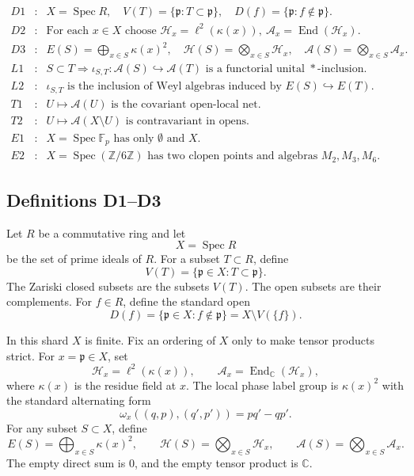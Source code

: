 \[
\begin{array}{rcl}
D1&:&X=\operatorname{Spec}R,\quad
      V(T)=\{\mathfrak p:T\subset\mathfrak p\},\quad
      D(f)=\{\mathfrak p:f\notin\mathfrak p\}.\\
D2&:&\text{For each }x\in X\text{ choose }
      \mathcal H_x=\ell^2(\kappa(x)),\
      \mathcal A_x=\operatorname{End}(\mathcal H_x).\\
D3&:&E(S)=\bigoplus_{x\in S}\kappa(x)^2,\quad
      \mathcal H(S)=\bigotimes_{x\in S}\mathcal H_x,\quad
      \mathcal A(S)=\bigotimes_{x\in S}\mathcal A_x.\\
L1&:&S\subset T\Rightarrow
      \iota_{S,T}:\mathcal A(S)\hookrightarrow\mathcal A(T)
      \text{ is a functorial unital }*\text{-inclusion}.\\
L2&:&\iota_{S,T}\text{ is the inclusion of Weyl algebras induced by }
      E(S)\hookrightarrow E(T).\\
T1&:&U\mapsto\mathcal A(U)\text{ is the covariant open-local net.}\\
T2&:&U\mapsto\mathcal A(X\setminus U)\text{ is contravariant in opens.}\\
E1&:&X=\operatorname{Spec}\mathbb F_p
      \text{ has only }\emptyset\text{ and }X.\\
E2&:&X=\operatorname{Spec}(\mathbb Z/6\mathbb Z)
      \text{ has two clopen points and algebras }M_2,M_3,M_6.
\end{array}
\]

\subsection{Definitions D1--D3}

Let \(R\) be a commutative ring and let
\[
  X=\operatorname{Spec}R
\]
be the set of prime ideals of \(R\).  For a subset \(T\subset R\), define
\[
  V(T)=\{\mathfrak p\in X:T\subset\mathfrak p\}.
\]
The Zariski closed subsets are the subsets \(V(T)\).  The open subsets are
their complements.  For \(f\in R\), define the standard open
\[
  D(f)=\{\mathfrak p\in X:f\notin\mathfrak p\}=X\setminus V(\{f\}).
\]

In this shard \(X\) is finite.  Fix an ordering of \(X\) only to make tensor
products strict.  For \(x=\mathfrak p\in X\), set
\[
  \mathcal H_x=\ell^2(\kappa(x)),\qquad
  \mathcal A_x=\operatorname{End}_{\mathbb C}(\mathcal H_x),
\]
where \(\kappa(x)\) is the residue field at \(x\).  The local phase label
group is \(\kappa(x)^2\) with the standard alternating form
\[
  \omega_x((q,p),(q',p'))=pq'-qp'.
\]
For any subset \(S\subset X\), define
\[
  E(S)=\bigoplus_{x\in S}\kappa(x)^2,\qquad
  \mathcal H(S)=\bigotimes_{x\in S}\mathcal H_x,\qquad
  \mathcal A(S)=\bigotimes_{x\in S}\mathcal A_x.
\]
The empty direct sum is \(0\), and the empty tensor product is \(\mathbb C\).

